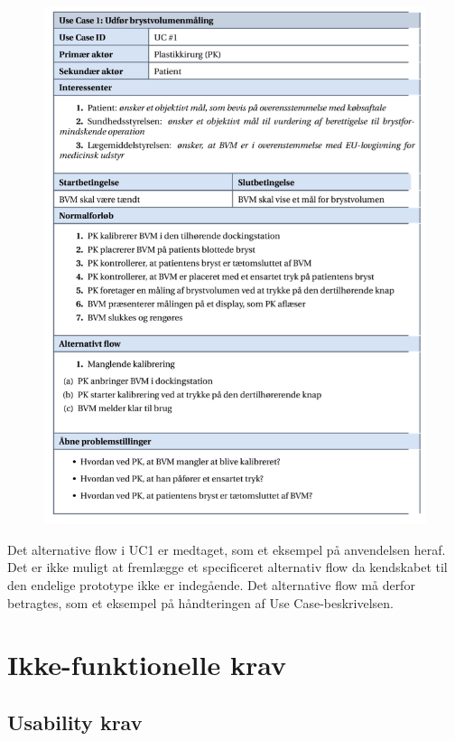   			\begin{figure}[htb]
  				\flushleft
  					\includegraphics[width=6in]{UCtabel}
  			\end{figure}
  			
  			
Det alternative flow i UC1 er medtaget, som et eksempel på anvendelsen heraf. Det er ikke muligt at fremlægge et specificeret alternativ flow da kendskabet til den endelige prototype ikke er indegående.  Det alternative flow må derfor betragtes, som et eksempel på håndteringen af Use Case-beskrivelsen. 
	
	\section{Ikke-funktionelle krav}
	
	\subsection{Usability krav}
	
